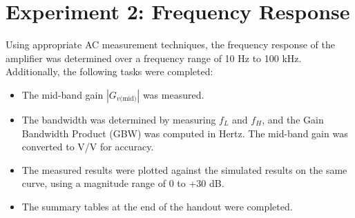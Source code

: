 \section{Experiment 2: Frequency Response}
\singlespacing
Using appropriate AC measurement techniques, the frequency response of the amplifier was determined over a frequency range of 10 Hz to 100 kHz. Additionally, the following tasks were completed:

\begin{itemize}

\item The mid-band gain $\left|G_{v\text{(mid)}}\right|$ was measured.
\item The bandwidth was determined by measuring $f_{L}$ and $f_{H}$, and the Gain Bandwidth Product (GBW) was computed in Hertz. The mid-band gain was converted to V/V for accuracy.
\item The measured results were plotted against the simulated results on the same curve, using a magnitude range of 0 to +30 dB.
\item The summary tables at the end of the handout were completed.

\end{itemize}

